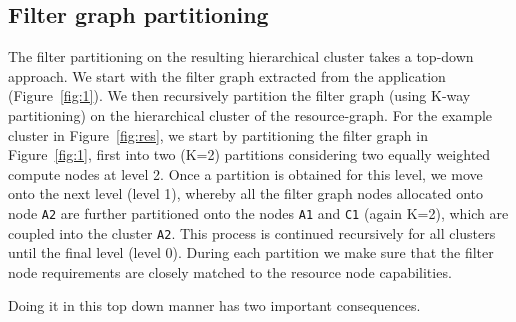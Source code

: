 
\subsection{Filter graph partitioning}
\label{sec:filter-graph-part}

The filter partitioning on the resulting hierarchical cluster takes a
top-down approach. We start with the filter graph extracted from the
application (Figure~\ref{fig:1}). We then recursively partition the filter
graph (using K-way partitioning) on the hierarchical cluster of the
resource-graph. For the example cluster in Figure~\ref{fig:res}, we
start by partitioning the filter graph in Figure~\ref{fig:1}, first into
two (K=2) partitions considering two equally weighted compute nodes at
level 2. Once a partition is obtained for this level, we move onto the
next level (level 1), whereby all the filter graph nodes allocated onto
node \texttt{A2} are further partitioned onto the nodes \texttt{A1} and
\texttt{C1} (again K=2), which are coupled into the cluster
\texttt{A2}. This process is continued recursively for all clusters until the
final level (level 0). During each partition we make
sure that the filter node requirements are closely matched to the resource
node capabilities.


Doing it in this top down manner has two important consequences.

